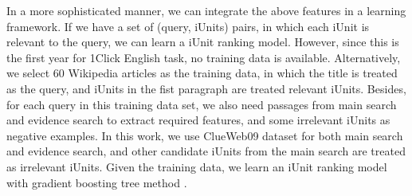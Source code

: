 In a more sophisticated manner, we can integrate the above features in a learning framework.
If we have a set of (query, iUnits) pairs, in which each iUnit is relevant to the query, we can learn a iUnit ranking model.
However, since this is the first year for 1Click English task, no training data is available. 
Alternatively, we select 60 Wikipedia articles as the training data, in which the title is treated as the query, and iUnits in the fist paragraph are treated relevant iUnits. 
Besides, for each query in this training data set, we also need passages from main search and evidence search to extract required features, and some irrelevant iUnits as negative examples.
In this work, we use ClueWeb09 dataset for both main search and evidence search, and other candidate iUnits from the main search are treated as irrelevant iUnits.
Given the training data, we learn an iUnit ranking model with gradient boosting tree method \cite{Li_etal_NIPS07}. 

